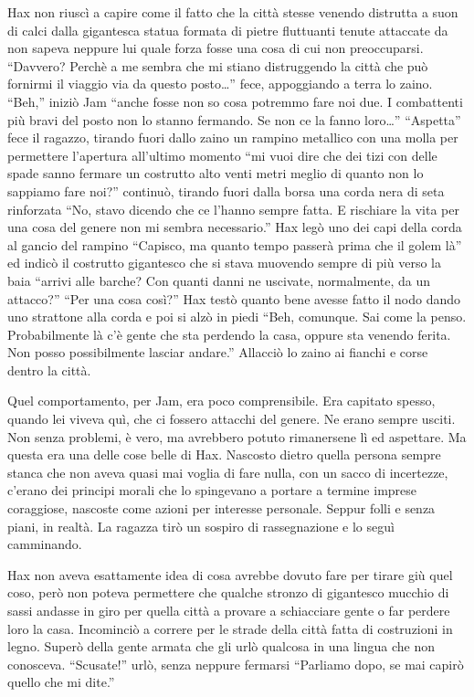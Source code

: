     Hax non riuscì a capire come il fatto che la città stesse venendo distrutta a suon di calci
    dalla gigantesca statua formata di pietre fluttuanti tenute attaccate
    da non sapeva neppure lui quale forza fosse una cosa di cui non
    preoccuparsi. ``Davvero? Perchè a me sembra che mi stiano distruggendo
    la città che può fornirmi il viaggio via da questo posto\dots{}''
    fece, appoggiando a terra lo zaino. ``Beh,'' iniziò Jam ``anche fosse
    non so cosa potremmo fare noi due. I combattenti più bravi del posto
    non lo stanno fermando. Se non ce la fanno loro\dots{}'' ``Aspetta''
    fece il ragazzo, tirando fuori dallo zaino un rampino metallico con una
    molla per permettere l'apertura all'ultimo momento ``mi vuoi dire che
    dei tizi con delle spade sanno fermare un costrutto alto venti metri
    meglio di quanto non lo sappiamo fare noi?'' continuò, tirando fuori
    dalla borsa una corda nera di seta rinforzata ``No, stavo dicendo che
    ce l'hanno sempre fatta. E rischiare la vita per una cosa del genere
    non mi sembra necessario.'' Hax legò uno dei capi della corda al gancio
    del rampino ``Capisco, ma quanto tempo passerà prima che il golem là''
    ed indicò il costrutto gigantesco che si stava muovendo sempre di più
    verso la baia ``arrivi alle barche? Con quanti danni ne uscivate,
    normalmente, da un attacco?'' ``Per una cosa così?'' Hax testò quanto
    bene avesse fatto il nodo dando uno strattone alla corda e poi si alzò
    in piedi ``Beh, comunque. Sai come la penso. Probabilmente là c'è gente
    che sta perdendo la casa, oppure sta venendo ferita. Non posso
    possibilmente lasciar andare.'' Allacciò lo zaino ai fianchi e
    corse dentro la città.

    Quel comportamento, per Jam, era poco comprensibile. Era capitato
    spesso, quando lei viveva quì, che ci fossero attacchi del genere. Ne
    erano sempre usciti. Non senza problemi, è vero, ma avrebbero potuto
    rimanersene lì ed aspettare. Ma questa era una delle cose belle di Hax.
    Nascosto dietro quella persona sempre stanca che non aveva quasi mai voglia
    di fare nulla, con un sacco di incertezze, c'erano dei principi morali
    che lo spingevano a portare a termine imprese coraggiose, nascoste come
    azioni per interesse personale. Seppur folli
    e senza piani, in realtà. La ragazza tirò un sospiro di rassegnazione e
    lo seguì camminando.

    Hax non aveva esattamente idea di cosa avrebbe dovuto fare per tirare
    giù quel coso, però non poteva permettere che qualche stronzo di
    gigantesco mucchio di sassi andasse in giro per quella città a provare
    a schiacciare gente o far perdere loro la casa. Incominciò a correre
    per le strade della città fatta di costruzioni in legno. Superò della
    gente armata che gli urlò qualcosa in una lingua che non conosceva.
    ``Scusate!'' urlò, senza neppure fermarsi ``Parliamo dopo, se mai
    capirò quello che mi dite.''

